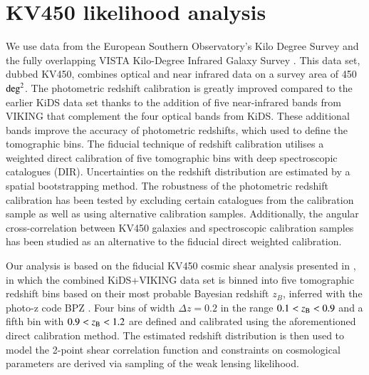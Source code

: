 \documentclass{aa}
\begin{document}
\section{KV450 likelihood analysis}
\label{sec:results}
We use data from the European Southern Observatory's Kilo Degree Survey \citep[KiDS; ][]{kuijken15, kuijken19,dejong15,dejong17} and the fully overlapping VISTA Kilo-Degree Infrared Galaxy Survey \citep[VIKING; ][]{2013Msngr.154...32E}. This data set, dubbed KV450, combines optical and near infrared data on a survey area of 450 ${\rm deg}^2$. The photometric redshift calibration is greatly improved compared to the earlier KiDS data set \citep{hildebrandt17} thanks to the addition of five near-infrared bands from VIKING that complement the four optical bands from KiDS. These additional bands improve the accuracy of photometric redshifts, which used to define the tomographic bins. The fiducial technique of redshift calibration utilises a weighted direct calibration of five tomographic bins with deep spectroscopic catalogues (DIR). Uncertainties on the redshift distribution are estimated by a spatial bootstrapping method. The robustness of the photometric redshift calibration has been tested by excluding certain catalogues from the calibration sample as well as using alternative calibration samples. Additionally, the angular cross-correlation between KV450 galaxies and spectroscopic calibration samples has been studied as an alternative to the fiducial direct weighted calibration.

Our analysis is based on the fiducial KV450 cosmic shear analysis presented in \cite{hildebrandt18}, in which the combined KiDS+VIKING data set \citep{2019A&A...632A..34W} is binned into five tomographic redshift bins based on their most probable Bayesian redshift $z_B$, inferred with the photo-z code {\sc BPZ} \citep{2000ApJ...536..571B}. Four bins of width $\Delta z = 0.2$ in the range $0.1 < z_{\rm B} <0.9$ and a fifth bin with $0.9 < z_{\rm B} < 1.2$ are defined and calibrated using the aforementioned direct calibration method. The estimated redshift distribution is then used to model the 2-point shear correlation function and constraints on cosmological parameters are derived via sampling of the weak lensing likelihood. 
\end{document}
